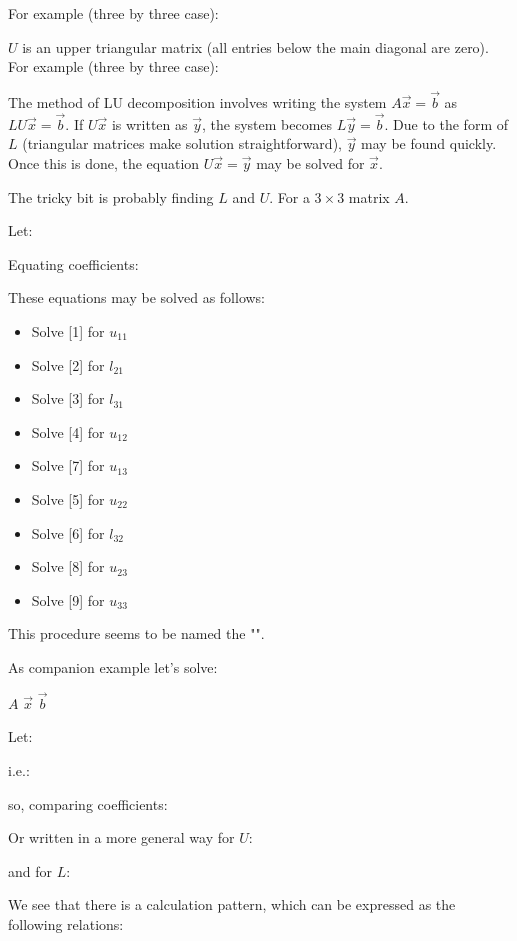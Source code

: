 	For example	(three by three case):
	
	$U$ is an upper triangular matrix (all entries below the main diagonal are zero). For example (three by three case):
	
	The method of LU decomposition involves writing the system $A\vec{x} = \vec{b}$ as $LU\vec{x} = \vec{b}$. If $U\vec{x}$ is written as $\vec{y}$, the system becomes $L\vec{y} = \vec{b}$. Due to the form of $L$ (triangular matrices make solution straightforward), $\vec{y}$ may be found quickly. Once this is done, the equation $U\vec{x} = \vec{y}$ may be solved for $\vec{x}$. 
	
	The tricky bit is probably finding $L$ and $U$. For a $3 \times 3$ matrix $A$.
	
	Let:
	
	Equating coefficients:
	
	These equations may be solved as follows:
	
	\begin{itemize}
		\item Solve [1] for $u_{11}$ 
		\item Solve [2] for $l_{21}$
		\item Solve [3] for $l_{31}$
		\item Solve [4] for $u_{12}$
		\item Solve [7] for $u_{13}$
		\item Solve [5] for $u_{22}$
		\item Solve [6] for $l_{32}$
		\item Solve [8] for $u_{23}$
		\item Solve [9] for $u_{33}$ 
	\end{itemize}
	This procedure seems to be named the "".
	
	As companion example let's solve:
	
	\hspace{6.1cm} $A$ \hspace{1.6cm} $\vec{x}$ \hspace{1.4cm}
	$\vec{b}$
	
	Let:
	
	i.e.:
	
	so, comparing coefficients:
	
	Or written in a more general way for $U$:
	
	and for $L$:
	
	We see that there is a calculation pattern, which can be expressed as the following relations:
	
